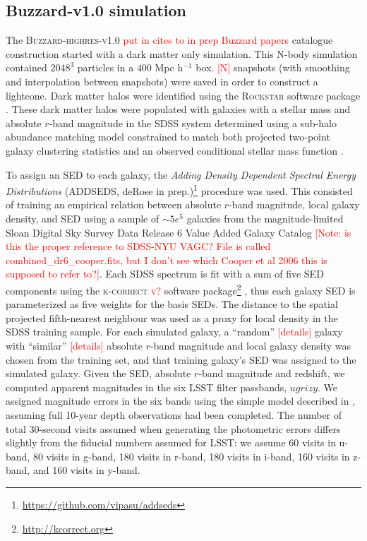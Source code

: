 \documentclass[usenatbib]{mn2e}
\newcommand{\red}[1]{\textcolor{red}{#1}}
\begin{document}
\subsection{Buzzard-v1.0 simulation}
\label{sec:buzzard}
The \textsc{Buzzard-highres-v1.0} \red{put in cites to in prep Buzzard papers} catalogue construction started with a dark matter only simulation. This N-body simulation contained $2048^3$ particles in a $400$ Mpc h$^{-1}$ box. \red{[N]} snapshots (with smoothing and interpolation between snapshots) were saved in order to construct a lightcone. Dark matter halos were identified using the \textsc{Rockstar} software package \citep{Behroozi:13}. These dark matter halos were populated with galaxies with a stellar mass and absolute $r$-band magnitude in the SDSS system determined using a sub-halo abundance matching model constrained to match both projected two-point galaxy clustering statistics and an observed conditional stellar mass function \citep{Reddick:13}. 

To assign an SED to each galaxy, the {\it Adding Density Dependent Spectral Energy Distributions} (\textsc{ADDSEDS}, deRose in prep.)\footnote{\url{https://github.com/vipasu/addseds}} procedure was used. This consisted of training an empirical relation between absolute $r$-band magnitude, local galaxy density, and SED using a sample of $\sim 5e^{5}$ galaxies from the magnitude-limited Sloan Digital Sky Survey Data Release 6 Value Added Galaxy Catalog \citep{Blanton:05}\red{[Note: is this the proper reference to SDSS-NYU VAGC? File is called combined\_dr6\_cooper.fits, but I don't see which Cooper et al 2006 this is supposed to refer to?]}. Each SDSS spectrum is fit with a sum of five SED components using the \textsc{k-correct \red{v?}} software package\footnote{\url{http://kcorrect.org}} \citep{Blanton:07}, thus each galaxy SED is parameterized as five weights for the basis SEDs. The distance to the spatial projected fifth-nearest neighbour was used as a proxy for local density in the SDSS training sample. For each simulated galaxy, a ``random'' \red{[details]} galaxy with ``similar'' \red{[details]} absolute $r$-band magnitude and local galaxy density was chosen from the training set, and that training galaxy's SED was assigned to the simulated galaxy. Given the SED, absolute $r$-band magnitude and redshift, we computed apparent magnitudes in the six LSST filter passbands, $ugrizy$. We assigned magnitude errors in the six bands using the simple model described in \citet{Ivezic:08}, assuming full 10-year depth observations had been completed.  The number of total 30-second visits assumed when generating the photometric errors differs slightly from the fiducial numbers assumed for LSST: we assume 60 visits in u-band, 80 visits in g-band, 180 visits in r-band, 180 visits in i-band, 160 visits in z-band, and 160 visits in y-band.
\end{document}
